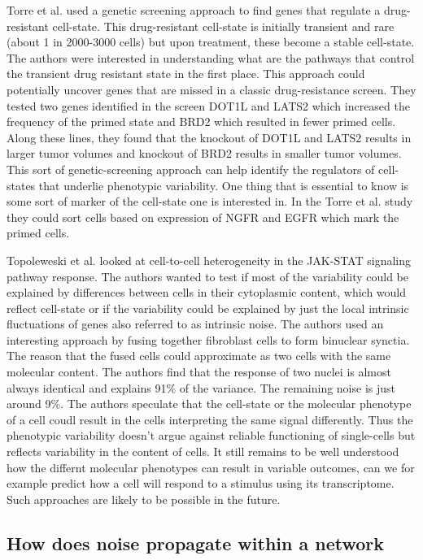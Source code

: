 Torre et al. \cite{torre2021ng} used a genetic screening approach to find genes that regulate a drug-resistant cell-state. This drug-resistant cell-state is initially transient and rare (about 1 in 2000-3000 cells) but upon treatment, these become a stable cell-state.  The authors were interested in understanding what are the pathways that control the transient drug resistant state in the first place. This approach could potentially uncover genes that are missed in a classic drug-resistance screen. They tested two genes identified in the screen DOT1L and LATS2 which increased the frequency of the primed state and BRD2 which resulted in fewer primed cells. Along these lines, they found that the knockout of DOT1L and LATS2 results in larger tumor volumes and knockout of BRD2 results in smaller tumor volumes. This sort of genetic-screening approach can help identify the regulators of cell-states that underlie phenotypic variability. One thing that is essential to know is some sort of marker of the cell-state one is interested in. In the Torre et al. study they could sort cells based on expression of NGFR and EGFR which mark the primed cells.

Topoleweski et al. \cite{topolewski2022ssb} looked at cell-to-cell heterogeneity in the JAK-STAT signaling pathway response. The authors wanted to test if most of the variability could be explained by differences between cells in their cytoplasmic content, which would reflect cell-state or if the variability could be explained by just the local intrinsic fluctuations of genes also referred to as intrinsic noise. The authors used an interesting approach by fusing together fibroblast cells to form binuclear synctia. The reason that the fused cells could approximate as two cells with the same molecular content. The authors find that the response of two nuclei is almost always identical and explains 91\% of the variance. The remaining noise is just around 9\%. The authors speculate that the cell-state or the molecular phenotype of a cell coudl result in the cells interpreting the same signal differently. Thus the phenotypic variability doesn't argue against reliable functioning of single-cells but reflects variability in the content of cells. It still remains to be well understood how the differnt molecular phenotypes can result in variable outcomes, can we for example predict how a cell will respond to a stimulus using its transcriptome. Such approaches are likely to be possible in the future.

\subsection{ How does noise propagate within a network}


